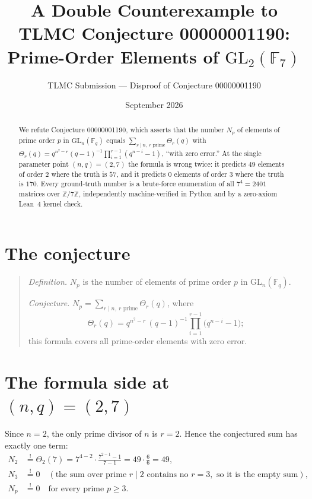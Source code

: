 \documentclass[11pt]{article}
\title{A Double Counterexample to TLMC Conjecture 00000001190:\\
Prime-Order Elements of $\mathrm{GL}_2(\mathbb{F}_7)$}
\author{TLMC Submission --- Disproof of Conjecture 00000001190}
\date{September 2026}
\begin{document}
\maketitle

\begin{abstract}
We refute Conjecture 00000001190, which asserts that the number $N_p$ of
elements of prime order $p$ in $\mathrm{GL}_n(\mathbb{F}_q)$ equals
$\sum_{r \mid n,\ r \text{ prime}} \Theta_r(q)$ with
$\Theta_r(q) = q^{n^2-r}(q-1)^{-1}\prod_{i=1}^{r-1}(q^{n-i}-1)$,
``with zero error.'' At the single parameter point $(n,q) = (2,7)$ the formula
is wrong twice: it predicts $49$ elements of order $2$ where the truth is $57$,
and it predicts $0$ elements of order $3$ where the truth is $170$. Every
ground-truth number is a brute-force enumeration of all $7^4 = 2401$ matrices
over $\mathbb{Z}/7\mathbb{Z}$, independently machine-verified in Python and by a
zero-axiom Lean~4 kernel check.
\end{abstract}

\section{The conjecture}

\begin{quote}
\textit{Definition.} $N_p$ is the number of elements of prime order $p$ in
$\mathrm{GL}_n(\mathbb{F}_q)$.

\textit{Conjecture.} $N_p = \sum_{r \mid n,\ r \text{ prime}} \Theta_r(q)$,
where
\[
\Theta_r(q) = q^{n^2-r}\,(q-1)^{-1}\prod_{i=1}^{r-1}\bigl(q^{n-i}-1\bigr);
\]
this formula covers all prime-order elements with zero error.
\end{quote}

\section{The formula side at $(n,q) = (2,7)$}

Since $n = 2$, the only prime divisor of $n$ is $r = 2$. Hence the conjectured
sum has exactly one term:
\begin{align}
N_2 &\overset{!}{=} \Theta_2(7)
      = 7^{4-2}\cdot\frac{7^{2-1}-1}{7-1}
      = 49 \cdot \frac{6}{6} = \boxed{49},\\
N_3 &\overset{!}{=} 0 \quad (\text{the sum over prime } r \mid 2 \text{ contains no } r = 3,
      \text{ so it is the empty sum}),\\
N_p &\overset{!}{=} 0 \quad \text{for every prime } p \ge 3.
\end{align}
\end{document}
